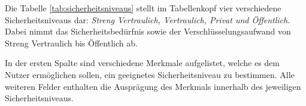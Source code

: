 \documentclass  [paper=a4,
				fontsize=12pt,
				listof=totoc,
				bibliography=totoc
				]{scrreprt}
\begin{document}
		
		Die Tabelle \ref{tab:sicherheitsniveaus} stellt im Tabellenkopf vier verschiedene Sicherheitsniveaus dar: \textit{Streng Vertraulich, Vertraulich, Privat und Öffentlich}. Dabei nimmt das Sicherheitsbedürfnis sowie der Verschlüsselungsaufwand von Streng Vertraulich bis Öffentlich ab.
		
		In der ersten Spalte sind verschiedene Merkmale aufgelistet, welche es dem Nutzer ermöglichen sollen, 
		ein geeignetes Sicherheitsniveau zu bestimmen.
		Alle weiteren Felder enthalten die Ausprägung des Merkmals innerhalb des jeweiligen Sicherheitsniveaus.
		\medskip\\
		
	\pagebreak
\end{document}
